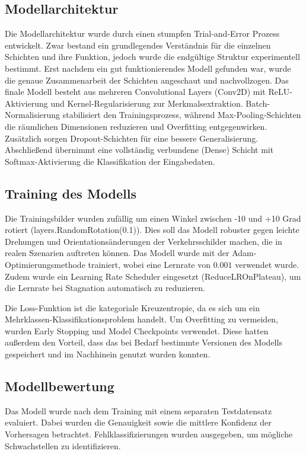 \documentclass[runningheads]{llncs}
\begin{document}
\subsection{Modellarchitektur}
Die Modellarchitektur wurde durch einen stumpfen Trial-and-Error Prozess entwickelt. Zwar bestand ein grundlegendes Verständnis
für die einzelnen Schichten und ihre Funktion, jedoch wurde die endgültige Struktur experimentell bestimmt.
Erst nachdem ein gut funktionierendes Modell gefunden war, wurde die genaue Zusammenarbeit der Schichten angeschaut und
nachvollzogen. Das finale Modell besteht aus mehreren Convolutional Layers (Conv2D) mit ReLU-Aktivierung und Kernel-Regularisierung
zur Merkmalsextraktion. Batch-Normalisierung stabilisiert den Trainingsprozess, während Max-Pooling-Schichten die räumlichen
Dimensionen reduzieren und Overfitting entgegenwirken. Zusätzlich sorgen Dropout-Schichten für eine bessere Generalisierung.
Abschließend übernimmt eine vollständig verbundene (Dense) Schicht mit Softmax-Aktivierung die Klassifikation der Eingabedaten.

\subsection{Training des Modells}
Die Trainingsbilder wurden zufällig um einen Winkel zwischen -10 und +10 Grad rotiert (layers.RandomRotation(0.1)). Dies soll das Modell
robuster gegen leichte Drehungen und Orientationsänderungen der Verkehrsschilder machen, die in realen Szenarien auftreten können.
Das Modell wurde mit der Adam-Optimierungsmethode trainiert, wobei eine Lernrate von $0.001$ verwendet wurde. Zudem wurde ein
Learning Rate Scheduler eingesetzt (ReduceLROnPlateau), um die Lernrate bei Stagnation automatisch zu reduzieren.

Die Loss-Funktion ist die kategoriale Kreuzentropie, da es sich um ein Mehrklassen-Klassifikationsproblem handelt.
Um Overfitting zu vermeiden, wurden Early Stopping und Model Checkpoints verwendet. Diese hatten außerdem den Vorteil, dass
das bei Bedarf bestimmte Versionen des Modells gespeichert und im Nachhinein genutzt wurden konnten.

\subsection{Modellbewertung}
Das Modell wurde nach dem Training mit einem separaten Testdatensatz evaluiert. Dabei wurden die Genauigkeit sowie die mittlere
Konfidenz der Vorhersagen betrachtet. Fehlklassifizierungen wurden ausgegeben, um mögliche Schwachstellen zu identifizieren.
\end{document}

